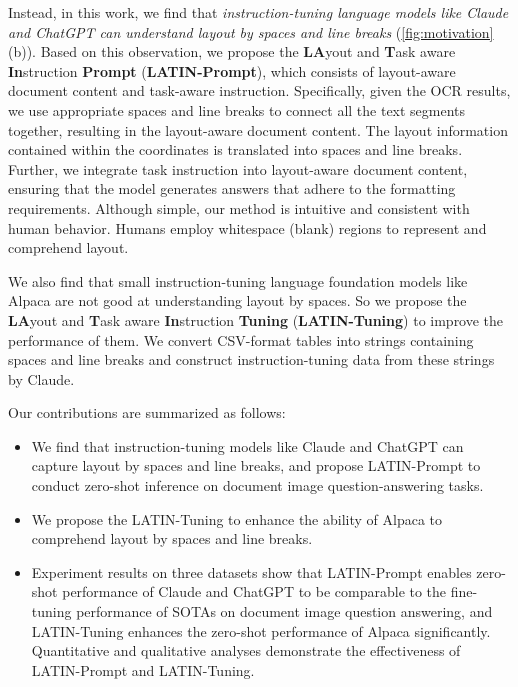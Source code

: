 \documentclass[letterpaper]{article} \usepackage{aaai24_preprint}  \usepackage{times}  \usepackage{helvet}  \usepackage{courier}  \usepackage[hyphens]{url}  \usepackage{graphicx} \urlstyle{rm} \def\UrlFont{\rm}  \usepackage{natbib}  \usepackage{caption} \frenchspacing  \setlength{\pdfpagewidth}{8.5in} \setlength{\pdfpageheight}{11in} \usepackage{algorithm}
\begin{document}
Instead, in this work, we find that \emph{instruction-tuning language models like Claude and ChatGPT can understand layout by spaces and line breaks} (\cref{fig:motivation}(b)).
Based on this observation, we propose the \textbf{LA}yout and \textbf{T}ask aware \textbf{In}struction \textbf{Prompt} (\textbf{LATIN-Prompt}), which consists of layout-aware document content and task-aware instruction.
Specifically, given the OCR results, we use appropriate spaces and line breaks to connect all the text segments together, resulting in the layout-aware document content.
The layout information contained within the coordinates is translated into spaces and line breaks.
Further, we integrate task instruction into layout-aware document content, ensuring that the model generates answers that adhere to the formatting requirements.
Although simple, our method is intuitive and consistent with human behavior.
Humans employ whitespace (blank) regions to represent and comprehend layout.

We also find that small instruction-tuning language foundation models like Alpaca are not good at understanding layout by spaces.
So we propose the \textbf{LA}yout and \textbf{T}ask aware \textbf{In}struction \textbf{Tuning} (\textbf{LATIN-Tuning}) to improve the performance of them.
We convert CSV-format tables into strings containing spaces and line breaks and construct instruction-tuning data from these strings by Claude.

Our contributions are summarized as follows:
\begin{itemize}
\item We find that instruction-tuning models like Claude and ChatGPT can capture layout by spaces and line breaks, and propose LATIN-Prompt to conduct zero-shot inference on document image question-answering tasks.
\item We propose the LATIN-Tuning to enhance the ability of Alpaca to comprehend layout by spaces and line breaks.
\item Experiment results on three datasets show that LATIN-Prompt enables zero-shot performance of Claude and ChatGPT to be comparable to the fine-tuning performance of SOTAs on document image question answering, and LATIN-Tuning enhances the zero-shot performance of Alpaca significantly.
Quantitative and qualitative analyses demonstrate the effectiveness of LATIN-Prompt and LATIN-Tuning.
\end{itemize}
\end{document}
